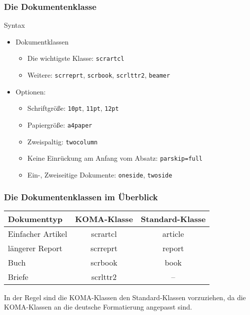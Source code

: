 \begin{frame}[fragile]
    \frametitle{Die Dokumentenklasse}
    \begin{block}{Syntax}
    \end{block}
    \pause
    \begin{itemize}
        \item Dokumentklassen
        \begin{itemize}
            \item Die wichtigste Klasse: \verb+scrartcl+\pause
            \item Weitere: \verb+scrreprt+, \verb+scrbook+, \verb+scrlttr2+, \verb+beamer+\pause
        \end{itemize}
        \item Optionen:
        \begin{itemize}
            \item Schriftgröße: \verb+10pt+, \verb+11pt+, \verb+12pt+\pause
            \item Papiergröße: \verb+a4paper+\pause
            \item Zweispaltig: \verb+twocolumn+\pause
            \item Keine Einrückung am Anfang vom Absatz: \verb+parskip=full+
            \item Ein-, Zweiseitige Dokumente: \verb+oneside+, \verb+twoside+
        \end{itemize}
    \end{itemize}
\end{frame}


\begin{frame}
    \frametitle{Die Dokumentenklassen im Überblick}

    \begin{tabular}{l|c|c}
        Dokumenttyp & KOMA-Klasse & Standard-Klasse\\
        \hline
        Einfacher Artikel & scrartcl & article\\
        längerer Report & scrreprt & report\\
        Buch & scrbook & book\\
        Briefe & scrlttr2 & --
    \end{tabular}
    
    \bigskip\pause
    
    In der Regel sind die KOMA-Klassen den Standard-Klassen vorzuziehen, da die KOMA-Klassen an die deutsche Formatierung angepasst sind.
\end{frame}


